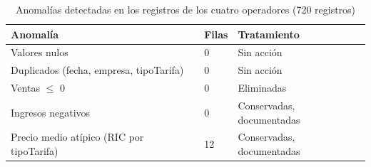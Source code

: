 \begin{table}[htbp]
\caption{Anomal\'ias detectadas en los registros de los cuatro operadores (720 registros)}
\label{tab:anomalias}
\centering
\scriptsize
\renewcommand{\arraystretch}{1.15}
\begin{tabular}{@{}p{3.0cm} p{1.0cm} p{3.5cm}@{}}
\hline
\textbf{Anomal\'ia} & \textbf{Filas} & \textbf{Tratamiento} \\
\hline
Valores nulos & 0 & Sin acci\'on \\
Duplicados (fecha, empresa, tipoTarifa) & 0 & Sin acci\'on \\
Ventas $\leq$ 0 & 0 & Eliminadas \\
Ingresos negativos & 0 & Conservadas, documentadas \\
Precio medio at\'ipico (RIC por tipoTarifa) & 12 & Conservadas, documentadas \\
\hline
\end{tabular}
\end{table}
\FloatBarrier
